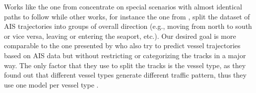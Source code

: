 Works like the one from \cite{martinsen2018curved} concentrate on special scenarios with almost identical paths to follow while other works, for instance the one from \cite{edgardo}, split the dataset of AIS trajectories into groups of overall direction (e.g., moving from north to south or vice versa, leaving or entering the seaport, etc.). Our desired goal is more comparable to the one presented by \cite{venskus2021unsupervised} who also try to predict vessel trajectories based on AIS data but without restricting or categorizing the tracks in a major way. The only factor that they use to split the tracks is the vessel type, as they found out that different vessel types generate different traffic pattern, thus they use one model per vessel type \cite[p.~729]{venskus2021unsupervised}.